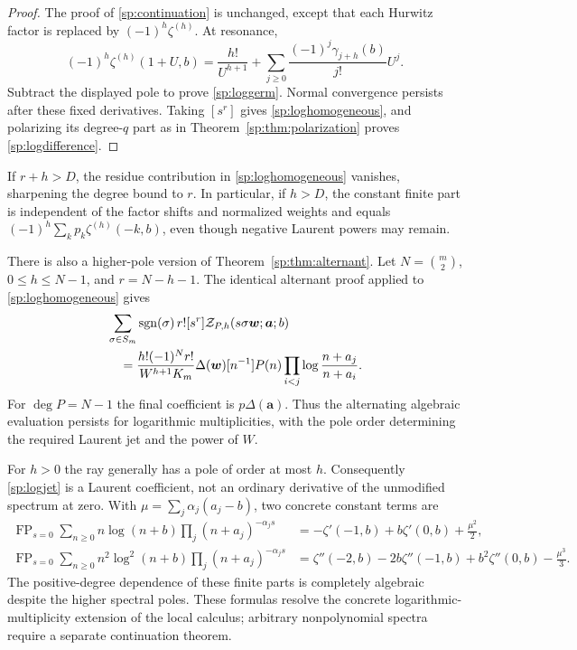 \documentclass[11pt,letterpaper]{article}
\numberwithin{equation}{section}
\theoremstyle{plain}
\theoremstyle{definition}
\theoremstyle{remark}
\DeclareMathOperator{\FP}{FP}
\newcommand{\cZ}{\mathcal Z}
\begin{document}
\begin{proof}
The proof of \eqref{sp:continuation} is unchanged, except that each
Hurwitz factor is replaced by $(-1)^h\zeta^{(h)}$. At resonance,
\[
 (-1)^h\zeta^{(h)}(1+U,b)
  =\frac{h!}{U^{h+1}}
          +\sum_{j\ge0}\frac{(-1)^j\gamma_{j+h}(b)}{j!}U^j.
\]
Subtract the displayed pole to prove \eqref{sp:loggerm}. Normal
convergence persists after these fixed derivatives. Taking $[s^r]$
gives \eqref{sp:loghomogeneous}, and polarizing its degree-$q$ part
as in Theorem~\ref{sp:thm:polarization} proves
\eqref{sp:logdifference}.
\end{proof}

If $r+h>D$, the residue contribution in \eqref{sp:loghomogeneous}
vanishes, sharpening the degree bound to $r$. In particular, if $h>D$,
the constant finite part is independent of the factor shifts and
normalized weights and equals
$(-1)^h\sum_kp_k\zeta^{(h)}(-k,b)$, even though negative Laurent
powers may remain.

There is also a higher-pole version of Theorem~\ref{sp:thm:alternant}.
Let $N=\binom m2$, $0\le h\le N-1$, and $r=N-h-1$. The identical
alternant proof applied to \eqref{sp:loghomogeneous} gives
\begin{align}\label{sp:logalternant}
 &\sum_{\sigma\in S_m}\operatorname{sgn}(\sigma)\,
      r![s^r]\cZ_{P,h}(s\sigma\boldsymbol w;\boldsymbol a;b)\notag\\
 &\quad=\frac{h!(-1)^N r!}{W^{h+1}K_m}\Delta(\boldsymbol w)
       [n^{-1}]P(n)\prod_{i<j}\log\frac{n+a_j}{n+a_i}.
\end{align}
For $\deg P=N-1$ the final coefficient is
$p\Delta(\boldsymbol a)$. Thus the alternating algebraic evaluation
persists for logarithmic multiplicities, with the pole order determining
the required Laurent jet and the power of $W$.

For $h>0$ the ray generally has a pole of order at most $h$.
Consequently \eqref{sp:logjet} is a Laurent coefficient, not an
ordinary derivative of the unmodified spectrum at zero. With
$\mu=\sum_j\alpha_j(a_j-b)$, two concrete constant terms are
\begin{align}
 \FP_{s=0}\sum_{n\ge0}n\log(n+b)\prod_j(n+a_j)^{-\alpha_js}
  &=-\zeta'(-1,b)+b\zeta'(0,b)+\frac{\mu^2}2,
 \label{sp:logexample1}\\
 \FP_{s=0}\sum_{n\ge0}n^2\log^2(n+b)\prod_j(n+a_j)^{-\alpha_js}
  &=\zeta''(-2,b)-2b\zeta''(-1,b)+b^2\zeta''(0,b)
       -\frac{\mu^3}3.
 \label{sp:logexample2}
\end{align}
The positive-degree dependence of these finite parts is completely
algebraic despite the higher spectral poles. These formulas resolve
the concrete logarithmic-multiplicity extension of the local calculus;
arbitrary nonpolynomial spectra require a separate continuation theorem.
\end{document}

